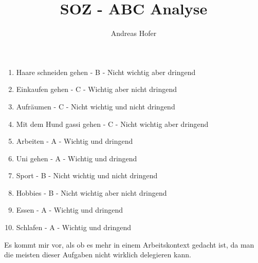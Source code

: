 \documentclass{article}
\title{\vspace{-1cm}SOZ - ABC Analyse}
\author{Andreas Hofer}
\begin{document}
	\maketitle
	\begin{enumerate}
		\item{Haare schneiden gehen - B - Nicht wichtig aber dringend}
    \item{Einkaufen gehen - C - Wichtig aber nicht dringend}
    \item{Aufräumen - C - Nicht wichtig und nicht dringend}
    \item{Mit dem Hund gassi gehen - C - Nicht wichtig aber dringend}
    \item{Arbeiten - A - Wichtig und dringend}
    \item{Uni gehen - A - Wichtig und dringend}
    \item{Sport - B - Nicht wichtig und nicht dringend}
    \item{Hobbies - B - Nicht wichtig aber nicht dringend}
    \item{Essen - A - Wichtig und dringend}
    \item{Schlafen - A - Wichtig und dringend}
	\end{enumerate}
  Es kommt mir vor, als ob es mehr in einem Arbeitskontext gedacht ist, da man die meisten dieser Aufgaben nicht wirklich delegieren kann.
\end{document}
